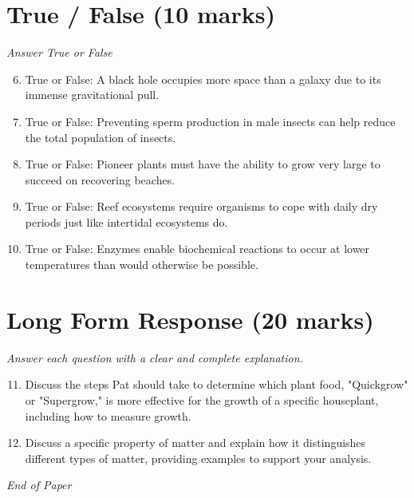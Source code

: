 \documentclass[12pt]{article}
\begin{document}
\section*{True / False (10 marks)}
\textit{Answer True or False}
\begin{enumerate}[label=\arabic*.]
\setcounter{enumi}{5}
\item True or False: A black hole occupies more space than a galaxy due to its immense gravitational pull.
\item True or False: Preventing sperm production in male insects can help reduce the total population of insects.
\item True or False: Pioneer plants must have the ability to grow very large to succeed on recovering beaches.
\item True or False: Reef ecosystems require organisms to cope with daily dry periods just like intertidal ecosystems do.
\item True or False: Enzymes enable biochemical reactions to occur at lower temperatures than would otherwise be possible.
\end{enumerate}

\section*{Long Form Response (20 marks)}
\textit{Answer each question with a clear and complete explanation.}
\begin{enumerate}[label=\arabic*.]
\setcounter{enumi}{10}
\item Discuss the steps Pat should take to determine which plant food, "Quickgrow" or "Supergrow," is more effective for the growth of a specific houseplant, including how to measure growth.
\item Discuss a specific property of matter and explain how it distinguishes different types of matter, providing examples to support your analysis.
\end{enumerate}

\vfill
\noindent\textit{End of Paper}
\end{document}
